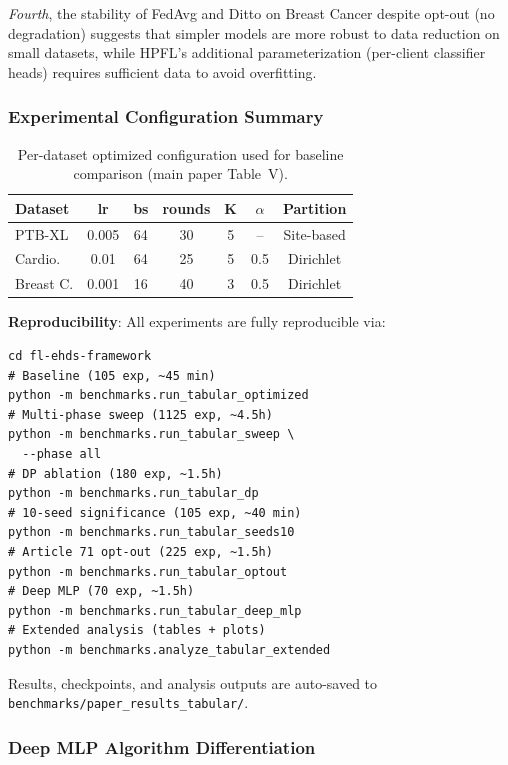 \documentclass[conference]{IEEEtran}
\begin{document}
\textit{Fourth}, the stability of FedAvg and Ditto on Breast Cancer despite opt-out (no degradation) suggests that simpler models are more robust to data reduction on small datasets, while HPFL's additional parameterization (per-client classifier heads) requires sufficient data to avoid overfitting.

\subsubsection{Experimental Configuration Summary}

\begin{table}[t]
\centering
\caption{Per-dataset optimized configuration used for baseline comparison (main paper Table~V).}
\label{tab:dataset_config}
\small
\renewcommand{\arraystretch}{1.4}
\setlength{\tabcolsep}{3pt}
\begin{tabular}{lcccccc}
\toprule
\textbf{Dataset} & \textbf{lr} & \textbf{bs} & \textbf{rounds} & \textbf{K} & \textbf{$\alpha$} & \textbf{Partition} \\
\midrule
PTB-XL & 0.005 & 64 & 30 & 5 & -- & Site-based \\
Cardio. & 0.01 & 64 & 25 & 5 & 0.5 & Dirichlet \\
Breast C. & 0.001 & 16 & 40 & 3 & 0.5 & Dirichlet \\
\bottomrule
\end{tabular}
\renewcommand{\arraystretch}{1.0}
\end{table}

\textbf{Reproducibility}: All experiments are fully reproducible via:
{\scriptsize
\begin{verbatim}
cd fl-ehds-framework
# Baseline (105 exp, ~45 min)
python -m benchmarks.run_tabular_optimized
# Multi-phase sweep (1125 exp, ~4.5h)
python -m benchmarks.run_tabular_sweep \
  --phase all
# DP ablation (180 exp, ~1.5h)
python -m benchmarks.run_tabular_dp
# 10-seed significance (105 exp, ~40 min)
python -m benchmarks.run_tabular_seeds10
# Article 71 opt-out (225 exp, ~1.5h)
python -m benchmarks.run_tabular_optout
# Deep MLP (70 exp, ~1.5h)
python -m benchmarks.run_tabular_deep_mlp
# Extended analysis (tables + plots)
python -m benchmarks.analyze_tabular_extended
\end{verbatim}
}

Results, checkpoints, and analysis outputs are auto-saved to \texttt{benchmarks/paper\_results\_tabular/}.

\subsubsection{Deep MLP Algorithm Differentiation}
\label{sec:deep_mlp}
\end{document}
